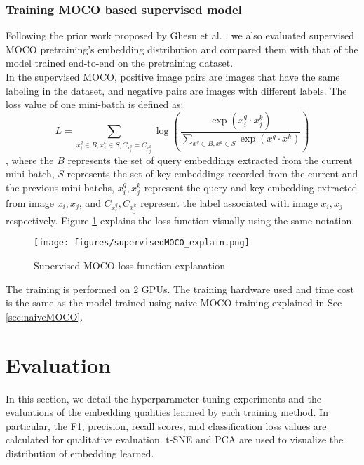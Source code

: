 \documentclass[12pt,twoside]{report}
\begin{document}
\subsection{Training MOCO based supervised model}
Following the prior work proposed by Ghesu et al. \cite{selfsupervisedlearningfrom100}, we also evaluated supervised MOCO pretraining's embedding distribution and compared them with that of the model trained end-to-end on the pretraining dataset.\\

In the supervised MOCO, positive image pairs are images that have the same labeling in the dataset, and negative pairs are images with different labels. The loss value of one mini-batch is defined as:
$$L = \sum_{x_i^q \in B, x_j^k \in S, C_{x_i^q} = C_{x_j^k}}\log(\frac{\exp(x_i^q \cdot x_j^k)}{\sum_{x^q \in B, x^k \in S}\exp(x^q \cdot x^k)})$$
, where the $B$ represents the set of query embeddings extracted from the current mini-batch, $S$ represents the set of key embeddings recorded from the current and the previous mini-batchs, $x_i^q, x_j^k$ represent the query and key embedding extracted from image $x_i, x_j$, and $C_{x_i^q}, C_{x_j^k}$ represent the label associated with image $x_i, x_j$ respectively. Figure \ref{fig:supervisedMOCO_loss_explain} explains the loss function visually using the same notation.\\

\begin{figure}
    \centering
    \texttt{[image: figures/supervisedMOCO\_explain.png]}
    \caption{Supervised MOCO loss function explanation}
    \label{fig:supervisedMOCO_loss_explain}
\end{figure}

The training is performed on 2 GPUs. The training hardware used and time cost is the same as the model trained using naive MOCO training explained in Sec \ref{sec:naiveMOCO}. 

\chapter{Evaluation}
In this section, we detail the hyperparameter tuning experiments and the evaluations of the embedding qualities learned by each training method. In particular, the F1, precision, recall scores, and classification loss values are calculated for qualitative evaluation. t-SNE and PCA are used to visualize the distribution of embedding learned. \\
\end{document}
